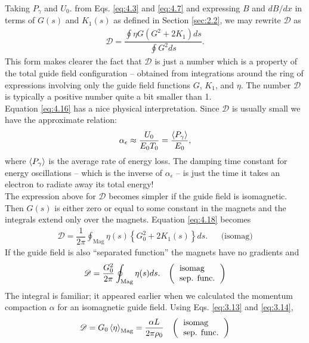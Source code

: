 Taking $P_\gamma$ and $U_0$. from Eqs. \eqref{eq:4.3} and \eqref{eq:4.7} and expressing
 $B$ and $dB/dx$ in terms of $G(s)$ and $K_1(s)$ as defined in Section \ref{sec:2.2}, we may rewrite $\mathscr{D}$ as
\begin{align} \label{eq:4.18}
	\mathscr{D} = \dfrac{\oint \eta G (G^2 + 2K_1)ds}{\oint G^2 ds}.
\end{align}
This form makes clearer the fact that $\mathscr{D}$ is just a number which is a property of
the total guide field configuration -- obtained from integrations around the ring of expressions
 involving only the guide field functions $G$, $K_1$, and $\eta$. The number $\mathscr{D}$ is typically a positive number quite a bit smaller than 1.\\
Equation \eqref{eq:4.16} has a nice physical interpretation. Since $\mathscr{D}$ is usually small
we have the approximate relation:
\begin{align}\label{eq:4.alfa_epsilon}
	\alpha_\epsilon \approx \dfrac{U_0}{E_0 T_0} = \dfrac{\left< P_\gamma \right>}{E_0},
\end{align}
where $\left< P_\gamma \right>$ is the average rate of energy loss. The damping time constant for energy oscillations -- which is the inverse of $\alpha_\epsilon$ -- is just the time it takes an electron to radiate away its total energy!\\
The expression above for $\mathscr{D}$ becomes simpler if the guide field is isomagnetic. Then $G(s)$ is either zero or equal to some constant in the magnets and the integrals extend only over the magnets. Equation \eqref{eq:4.18} becomes
\begin{align} \label{eq:4.20}
	\mathscr{D} = \dfrac{1}{2\pi}\oint_{\text{Mag}}\eta(s)\left\lbrace G_0^2 + 2K_1(s) \right\rbrace ds. && \text{(isomag)}
\end{align}
If the guide field is also ``separated function'' the magnets have no gradients and
\begin{align}\label{eq:4.17}
	\mathscr{D} = \dfrac{G_0^2}{2\pi}\oint_{\text{Mag}}\eta(s) ds. && \left(\begin{tabular}{l}
\text{isomag} \\
\text{sep. func.}
\end{tabular}\right)
\end{align}
The integral is familiar; it appeared earlier when we calculated the momentum compaction $\alpha$ for an isomagnetic guide field. Using Eqs. \eqref{eq:3.13} and \eqref{eq:3.14},
\begin{align}
	\mathscr{D} = G_0 \mean{\eta}_\text{Mag} = \dfrac{\alpha L}{2 \pi \rho_0} && \left(\begin{tabular}{l}
\text{isomag} \\
\text{sep. func.}
\end{tabular}\right)
\end{align}
